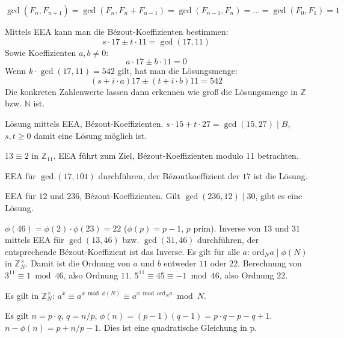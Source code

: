 \begin{flushenum}
\item $\gcd(F_n, F_{n+1}) = \gcd(F_n, F_n + F_{n-1}) = \gcd(F_{n-1}, F_n) = \ldots = \gcd(F_0, F_1) = 1$
\item Mittels EEA kann man die Bézout-Koeffizienten bestimmen:
\[ s \cdot 17 \pm t \cdot 11 = \gcd(17,11) \]
Sowie Koeffizienten $a,b \neq 0$:
\[ a \cdot 17 \pm b \cdot 11 = 0 \]
Wenn $k \cdot \gcd(17,11) = 542$ gilt, hat man die Lösungsmenge:
\[ (s + i\cdot a)17 \pm (t + i\cdot b)11 = 542 \]
Die konkreten Zahlenwerte lassen dann erkennen wie groß die Lösungsmenge in $\mathbb{Z}$ bzw. $\mathbb{N}$ ist.

\item Lösung mittels EEA, Bézout-Koeffizienten. $s \cdot 15 + t \cdot 27 = \gcd(15,27) \mid  B$, $s,t \geq 0$ damit eine Lösung möglich ist.

\item $13 \equiv 2$ in $\mathbb{Z}_{11}$. EEA führt zum Ziel, Bézout-Koeffizienten modulo $11$ betrachten.

\item EEA für $\gcd(17,101)$ durchführen, der Bézoutkoeffizient der $17$ ist die Lösung.

\item EEA für $12$ und $236$, Bézout-Koeffizienten. Gilt $\gcd(236,12) \mid 30$, gibt es eine Lösung.

\item $\phi(46) = \phi(2) \cdot \phi(23) = 22$ ($\phi(p) = p-1$, $p$ prim).
 Inverse von $13$ und $31$ mittels EEA für $\gcd(13,46)$ bzw. $\gcd(31,46)$ durchführen, der entsprechende Bézout-Koeffizient ist das Inverse.
 Es gilt für alle $a$: $\text{ord}_{N} a \mid \phi(N)$ in $\mathbb{Z}_N^{\times}$. Damit ist die Ordnung von $a$ und $b$ entweder $11$ oder $22$.
 Berechnung von $3^{11} \equiv 1 \bmod 46$, also Ordnung $11$. $5^{11} \equiv 45 \equiv -1 \bmod 46$, also Ordnung $22$.

\item Es gilt in $\mathbb{Z}_N^{\times}$: $a^x \equiv a^{x \bmod \phi(N)} \equiv a^{x \bmod \text{ord}_N a} \bmod N$.

\item Es gilt $n = p\cdot q$, $q = n/p$, $\phi(n) = (p-1)(q-1) = p\cdot q - p - q + 1$. $n - \phi(n) = p + n/p - 1$. Dies ist eine quadratische Gleichung in p.

\end{flushenum}
